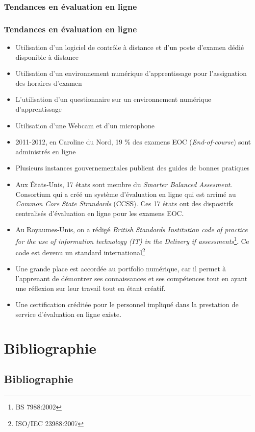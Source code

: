 \documentclass[aspectratio=169]{beamer}
\begin{document}
		\subsubsection{Tendances en évaluation en ligne} 
				\begin{frame}[allowframebreaks]
					\frametitle{Tendances en évaluation en ligne}				 	
				 	\begin {itemize}
						\item Utilisation d’un logiciel de contrôle à distance et d’un poste d’examen dédié disponible à distance
						\item Utilisation d'un environnement numérique d'apprentissage pour l’assignation des horaires d’examen			
						\item L’utilisation d’un questionnaire sur un environnement numérique d'apprentissage
						\item Utilisation d'une Webcam et d'un microphone
						\item 2011-2012, en Caroline du Nord, 19 \% des examens EOC  (\textit{End-of-course}) sont administrés en ligne\citep{NorthCarolina2013}
						\item Plusieurs instances gouvernementales publient des guides de bonnes pratiques
						\item Aux États-Unis, 17 états sont membre du \textit{Smarter Balanced Assesment}. Consortium qui a créé un système d'évaluation en ligne qui est arrimé au \textit{Common Core State Strandards} (CCSS). Ces 17 états ont des dispositifs centralisés d'évaluation en ligne pour les examens EOC.
						\item Au Royaumes-Unis, on a rédigé \textit{British Standards Institution code of practice for the use of information technology (IT) in the Delivery if assessments}\footnote{BS 7988:2002}. Ce code est devenu un standard international\footnote{ISO/IEC 23988:2007}
						\item Une grande place est accordée au portfolio numérique, car il permet à l'apprenant de démontrer ses connaissances et ses compétences tout en ayant une réflexion sur leur travail tout en étant créatif.
						\item Une certification créditée pour le personnel impliqué dans la prestation de service d'évaluation en ligne existe.
					\end{itemize}
\end{frame}
		
				
			

\section{Bibliographie}
\subsection{Bibliographie}
\end{document}
